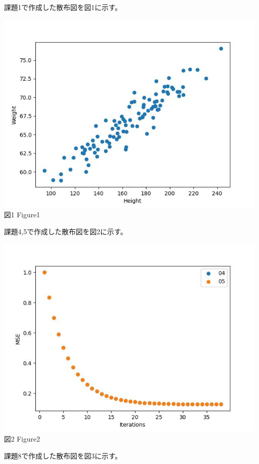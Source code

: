 \documentclass[a4paper]{ltjsarticle}
\begin{document}
\newpage
課題1で作成した散布図を図1に示す。
\begin{center}
    \includegraphics{Figure_1.jpeg} \\
    図1 Figure1
\end{center}
\newpage
課題4,5で作成した散布図を図2に示す。
\begin{center}
    \includegraphics{Figure_2.jpeg} \\
    図2 Figure2
\end{center}
\newpage
課題8で作成した散布図を図3に示す。
\end{document}
